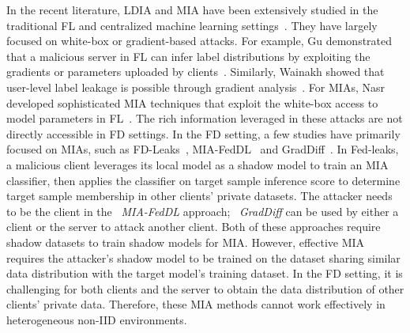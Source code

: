 In the recent literature, LDIA and MIA have been extensively studied in the traditional FL and centralized machine learning settings~\cite{nasr2019comprehensive,shokri2017membership,yeom2018privacy,melis2019exploiting, ramakrishna2022inferring, jiang2024protecting}.
They have largely focused on white-box or gradient-based attacks.
For example, Gu \etal demonstrated that a malicious server in FL can infer label distributions by exploiting the gradients or parameters uploaded by clients~\cite{gu2023ldia}.
Similarly, Wainakh \etal showed that user-level label leakage is possible through gradient analysis~\cite{wainakh2021user}.
For MIAs, Nasr \etal developed sophisticated MIA techniques that exploit the white-box access to model parameters in FL~\cite{nasr2019comprehensive}.
The rich information leveraged in these attacks are not directly accessible in FD settings.
In the FD setting, a few studies have primarily focused on MIAs, such as FD-Leaks~\cite{yang2022fd}, MIA-FedDL~\cite{liu2023mia} and GradDiff~\cite{wang2024graddiff}.
In Fed-leaks, a malicious client leverages its local model as a shadow model to train an MIA classifier, then applies the classifier on target sample inference score to determine target sample membership in other clients' private datasets.
The attacker needs to be the client in the ~\textit{MIA-FedDL} approach; ~\textit{GradDiff} can be used by either a client or the server to attack another client. Both of these approaches require shadow datasets to train shadow models for MIA.
However, effective MIA requires the attacker's shadow model to be trained on the dataset sharing similar data distribution with the target model's training dataset.
In the FD setting, it is challenging for both clients and the server to obtain the data distribution of other clients' private data. 
Therefore, these MIA methods cannot work effectively in heterogeneous non-IID environments.

